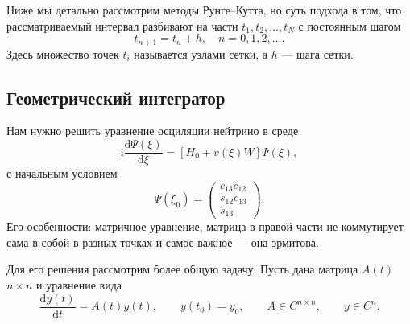 \documentclass[a4paper,12pt]{article}
\newcommand{\dd}{\mathrm{d}}
\renewcommand{\imath}{\mathrm{i}}
\begin{document}
  Ниже мы детально рассмотрим методы Рунге--Кутта, но суть подхода в том, что
  рассматриваемый интервал разбивают на части \(t_1,t_2,...,t_N\) с постоянным
  шагом
	\begin{equation}\label{eq:22}
			t_{n+1}=t_n+h,\quad n=0, 1, 2,\ldots.
	\end{equation}
	Здесь множество точек \(t_i\) называется узлами сетки, а \(h\) --- шага сетки.
	

\subsection{Геометрический интегратор}

		Нам нужно решить уравнение осциляции нейтрино в среде
	\begin{equation}\label{eq:15}
		\imath\frac{\dd\Psi(\xi)}{\dd\xi}=[H_{0}+ v(\xi)W]\Psi(\xi),
	\end{equation}
	с начальным условием
	\begin{equation}\label{eq:19}
		\Psi(\xi_0)=
		\begin{pmatrix}
			c_{13}c_{12}\\
			s_{12}c_{13}\\
			s_{13}
		\end{pmatrix}.
	\end{equation}
	Его особенности: матричное уравнение, матрица в правой части не коммутирует сама в собой в разных точках и самое важное — она эрмитова.

Для его решения рассмотрим более общую задачу. Пусть дана матрица \(A(t)\) \(n\times n\) и уравнение вида
	\begin{equation}\label{eq:41}
		\frac{\dd y(t)}{\dd t}=A(t)y(t),\qquad y(t_0)=y_0,\qquad A\in C^{n \times n},\qquad y\in C^{n}.
	\end{equation}
\end{document}
